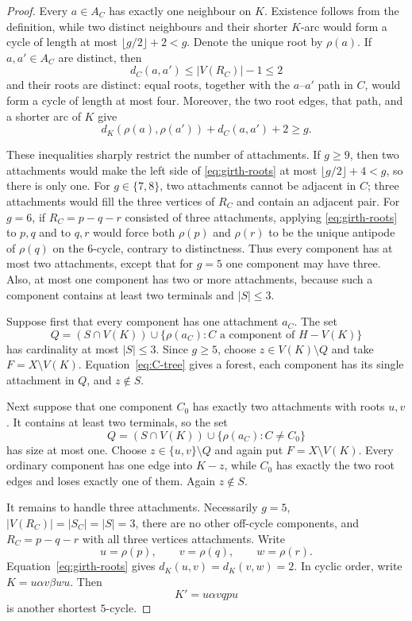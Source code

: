 \documentclass[11pt]{article}
\numberwithin{equation}{section}
\theoremstyle{remark}
\begin{document}
\begin{proof}
Every $a\in A_C$ has exactly one neighbour on $K$.  Existence follows from
the definition, while two distinct neighbours and their shorter $K$-arc
would form a cycle of length at most $\lfloor g/2\rfloor+2<g$.  Denote the
unique root by $\rho(a)$.  If $a,a'\in A_C$ are distinct, then
\begin{equation}\label{eq:attachment-distance}
 d_C(a,a')\le |V(R_C)|-1\le2
\end{equation}
and their roots are distinct: equal roots, together with the
$a$--$a'$ path in $C$, would form a cycle of length at most four.  Moreover,
the two root edges, that path, and a shorter arc of $K$ give
\begin{equation}\label{eq:girth-roots}
 d_K(\rho(a),\rho(a'))+d_C(a,a')+2\ge g.
\end{equation}

These inequalities sharply restrict the number of attachments.  If
$g\ge9$, then two attachments would make the left side of
\eqref{eq:girth-roots} at most $\lfloor g/2\rfloor+4<g$, so there is only
one.  For $g\in\{7,8\}$, two attachments cannot be adjacent in $C$; three
attachments would fill the three vertices of $R_C$ and contain an adjacent
pair.  For $g=6$, if $R_C=p-q-r$ consisted of three attachments, applying
\eqref{eq:girth-roots} to $p,q$ and to $q,r$ would force both $\rho(p)$ and
$\rho(r)$ to be the unique antipode of $\rho(q)$ on the $6$-cycle,
contrary to distinctness.  Thus every component has at most two
attachments, except that for $g=5$ one component may have three.  Also, at
most one component has two or more attachments, because such a component
contains at least two terminals and $|S|\le3$.

Suppose first that every component has one attachment $a_C$.  The set
\[
 Q=(S\cap V(K))\cup\{\rho(a_C):C\text{ a component of }H-V(K)\}
\]
has cardinality at most $|S|\le3$.  Since $g\ge5$, choose $z\in V(K)\setminus
Q$ and take $F=X\setminus V(K)$.  Equation~\eqref{eq:C-tree} gives a forest,
each component has its single attachment in $Q$, and $z\notin S$.

Next suppose that one component $C_0$ has exactly two attachments with roots
$u,v$.  It contains at least two terminals, so the set
\[
 Q=(S\cap V(K))\cup
   \{\rho(a_C):C\ne C_0\}
\]
has size at most one.  Choose $z\in\{u,v\}\setminus Q$ and again put
$F=X\setminus V(K)$.  Every ordinary component has one edge into $K-z$,
while $C_0$ has exactly the two root edges and loses exactly one of them.
Again $z\notin S$.

It remains to handle three attachments.  Necessarily $g=5$,
$|V(R_C)|=|S_C|=|S|=3$, there are no other off-cycle components, and
$R_C=p-q-r$ with all three vertices attachments.  Write
\[
 u=\rho(p),\qquad v=\rho(q),\qquad w=\rho(r).
\]
Equation~\eqref{eq:girth-roots} gives $d_K(u,v)=d_K(v,w)=2$.  In cyclic
order, write $K=u\alpha v\beta w u$.  Then
\[
  K'=u\alpha v q p u
\]
is another shortest $5$-cycle.


\end{proof}
\end{document}
